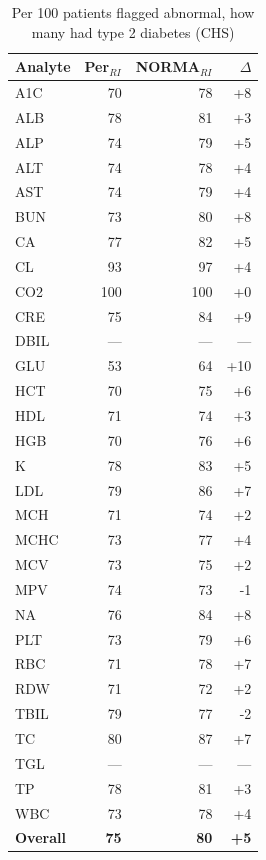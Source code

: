 \begin{table}[ht]
\centering
\footnotesize
\caption{Per 100 patients flagged abnormal, how many had type 2 diabetes (CHS)}
\begin{tabular}{lrrr}
\toprule
Analyte & Per$_{RI}$ & NORMA$_{RI}$ & $\Delta$ \\
\midrule
A1C & 70 & 78 & +8 \\
ALB & 78 & 81 & +3 \\
ALP & 74 & 79 & +5 \\
ALT & 74 & 78 & +4 \\
AST & 74 & 79 & +4 \\
BUN & 73 & 80 & +8 \\
CA & 77 & 82 & +5 \\
CL & 93 & 97 & +4 \\
CO2 & 100 & 100 & +0 \\
CRE & 75 & 84 & +9 \\
DBIL & --- & --- & --- \\
GLU & 53 & 64 & +10 \\
HCT & 70 & 75 & +6 \\
HDL & 71 & 74 & +3 \\
HGB & 70 & 76 & +6 \\
K & 78 & 83 & +5 \\
LDL & 79 & 86 & +7 \\
MCH & 71 & 74 & +2 \\
MCHC & 73 & 77 & +4 \\
MCV & 73 & 75 & +2 \\
MPV & 74 & 73 & -1 \\
NA & 76 & 84 & +8 \\
PLT & 73 & 79 & +6 \\
RBC & 71 & 78 & +7 \\
RDW & 71 & 72 & +2 \\
TBIL & 79 & 77 & -2 \\
TC & 80 & 87 & +7 \\
TGL & --- & --- & --- \\
TP & 78 & 81 & +3 \\
WBC & 73 & 78 & +4 \\
\midrule
\textbf{Overall} & \textbf{75} & \textbf{80} & \textbf{+5} \\
\bottomrule
\end{tabular}
\end{table}